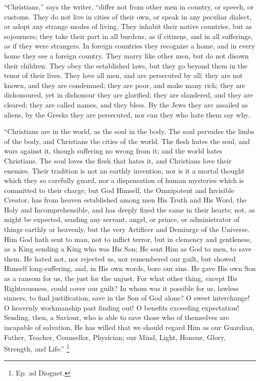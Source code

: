 ``Christians,'' says the writer, ``differ not from
other men in country, or speech, or customs. They do not live in
cities of their own, or speak in any peculiar dialect, or adopt any
strange modes of living. They inhabit their native countries, but as
sojourners; they take their part in all burdens, as if citizens, and
in all sufferings, as if they were strangers. In foreign countries
they recognize a home, and in every home they see a foreign country.
They marry like other men, but do not disown their children. They obey
the established laws, but they go beyond them in the tenor of their
lives. They love all men, and are persecuted by all; they are not
known, and they are condemned; they are poor, and make many rich; they
are dishonoured, yet in dishonour they are glorified; they are
slandered, and they are cleared; they are called names, and they
bless. By the Jews they are assailed as aliens, by the Greeks they are
persecuted, nor can they who hate them say why.

``Christians are in the world, as the soul in the body. The
soul pervades the limbs of the body, and Christians the cities of the
world. The flesh hates the soul, and wars against it, though suffering
no wrong from it; and the world hates Christians. The soul loves the
flesh that hates it, and Christians love their enemies. Their
tradition is not an earthly invention, nor is it a mortal thought
which they so carefully guard, nor a dispensation of human mysteries
which is committed to their charge; but God Himself, the Omnipotent
and Invisible Creator, has from heaven established among men His Truth
and His Word, the Holy and Incomprehensible, and has deeply fixed the
same in their hearts; not, as might be expected, sending any
servant, angel, or prince, or administrator of things earthly or
heavenly, but the very Artificer and Demiurge of the Universe. Him God
hath sent to man, not to inflict terror, but in clemency and
gentleness, as a King sending a King who was His Son; He sent Him as
God to men, to save them. He hated not, nor rejected us, nor
remembered our guilt, but showed Himself long-suffering, and, in His
own words, bore our sins. He gave His own Son as a ransom for us, the
just for the unjust. For what other thing, except His Righteousness,
could cover our guilt? In whom was it possible for us, lawless
sinners, to find justification, save in the Son of God alone? O sweet
interchange! O heavenly workmanship past finding out! O benefits
exceeding expectation! Sending, then, a Saviour, who is able to save
those who of themselves are incapable of salvation, He has willed that
we should regard Him as our Guardian, Father, Teacher, Counsellor,
Physician; our Mind, Light, Honour, Glory, Strength, and Life.'' \footnote{Ep. ad Diognet.}


